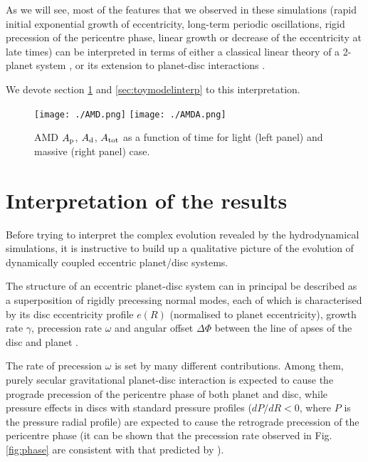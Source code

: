 \documentclass[usenatbib,a4paper,times,fleqn]{mnras}
\begin{document}
As we will see, most of the features that we observed in these simulations (rapid initial exponential growth of eccentricity, long-term periodic oscillations, rigid precession of the pericentre phase, linear growth or decrease of the eccentricity at late times) can be interpreted in terms of either a classical linear theory of a 2-planet system \citep{murray1999}, or its extension to planet-disc interactions \citep{teyssandier2016}. 

We devote section \ref{sec:interpretation} and \ref{sec:toymodelinterp} to this interpretation.

\begin{figure*}
\begin{center}
\texttt{[image: ./AMD.png]}
\texttt{[image: ./AMDA.png]}
\caption{AMD $A_{\rm p}$, $A_{\rm d}$, $A_{\rm tot}$ as a function of time for light (left panel) and massive (right panel) case. }
\label{fig:AMD}
\end{center}
\end{figure*}

\section{Interpretation of the results}\label{sec:interpretation}

Before trying to interpret the complex evolution revealed by the hydrodynamical simulations,  it is instructive to build up a qualitative picture of the evolution of dynamically coupled eccentric planet/disc systems.

The structure of an eccentric planet-disc system can in principal be described as a superposition of rigidly precessing normal modes, each
of which is characterised by its disc eccentricity profile $e(R)$ (normalised to planet eccentricity), growth rate $\gamma$, precession rate $\omega$ and angular offset $\Delta\Phi$ between the line of apses of the disc and planet \citep{teyssandier2016}.

The rate of precession $\omega$ is set by many different contributions. Among them, purely secular gravitational planet-disc interaction is expected to cause the prograde precession of the pericentre phase of both planet and disc, while pressure effects in discs with standard pressure profiles ($dP/dR<0$, where $P$ is the pressure radial profile) are expected to cause the retrograde precession of the pericentre phase (it can be shown that the precession rate observed in Fig. \ref{fig:phase} are consistent with that predicted by \citealp{teyssandier2016}). 
\end{document}
